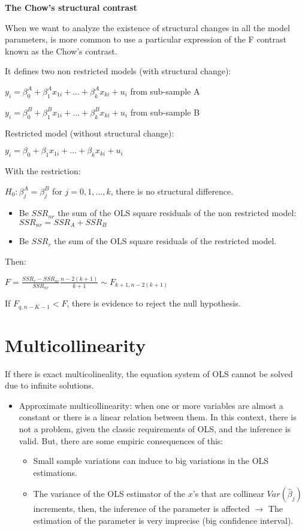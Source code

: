 \documentclass[10pt, a4paper, landscape]{extarticle}
\begin{document}
\begin{multicols}{3}
\textbf{The Chow's structural contrast}

When we want to analyze the existence of structural changes in all the model parameters, is more common to use a particular expression of the F contrast known as the Chow's contrast.

It defines two non restricted models (with structural change):

$y_i = \beta_0^A + \beta_1^A x_{1i} + ... + \beta_k^A x_{ki} + u_i$ from sub-sample A

$y_i = \beta_0^B + \beta_1^B x_{1i} + ... + \beta_k^B x_{ki} + u_i$ from sub-sample B

Restricted model (without structural change):

$y_i = \beta_0 + \beta_1 x_{1i} + ... + \beta_k x_{ki} + u_i$

With the restriction:

$H_0: \beta_j^A = \beta_j^B$ for $j=0,1,...,k$, there is no structural difference.

\begin{itemize}[leftmargin=*]
\item Be $SSR_{nr}$ the sum of the OLS square residuals of the non restricted model: $SSR_{nr} = SSR_A + SSR_B$
\item Be $SSR_r$ the sum of the OLS square residuals of the restricted model.
\end{itemize}

Then:

$F = \frac{SSR_r - SSR_{nr}}{SSR_{nr}} \frac{n-2(k+1)}{k+1} \sim F_{k+1,n-2(k+1)}$

If $F_{q, n-K-1} < F$, there is evidence to reject the null hypothesis.

\section*{Multicollinearity}

If there is exact multicolineality, the equation system of OLS cannot be solved due to infinite solutions.

\begin{itemize}[leftmargin=*]
\item Approximate multicollinearity: when one or more variables are almost a constant or there is a linear relation between them. In this context, there is not a problem, given the classic requirements of OLS, and the inference is valid. But, there are some empiric consequences of this:
\begin{itemize}[leftmargin=*]
\item Small sample variations can induce to big variations in the OLS estimations.
\item The variance of the OLS estimator of the $x$'s that are collinear $Var(\hat{\beta}_j)$ increments, then, the inference of the parameter is affected $\rightarrow$ The estimation of the parameter is very imprecise (big confidence interval).
\end{itemize}
\end{itemize}


\end{multicols}
\end{document}
